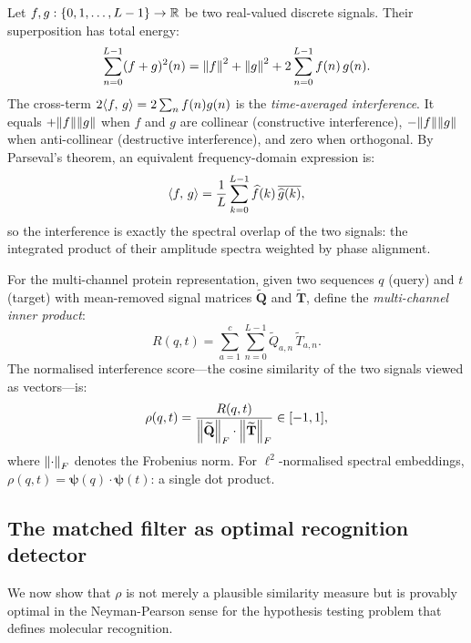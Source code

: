 Let $f, g: \{0,1,\ldots,L-1\} \to \mathbb{R}$ be two real-valued discrete signals.
Their superposition has total energy:
\begin{equation}
  \sum_{n=0}^{L-1}(f+g)^2(n)
  = \norm{f}^2 + \norm{g}^2
    + 2\sum_{n=0}^{L-1} f(n)\,g(n).
  \label{im:eq:superposition}
\end{equation}
The cross-term $2\langle f,\, g \rangle = 2\sum_n f(n)g(n)$ is the
\emph{time-averaged interference}. It equals $+\norm{f}\norm{g}$ when $f$
and $g$ are collinear (constructive interference),
$-\norm{f}\norm{g}$ when anti-collinear (destructive interference),
and zero when orthogonal. By Parseval's theorem, an equivalent frequency-domain
expression is:
\begin{equation}
  \langle f,\, g \rangle
  = \frac{1}{L}\sum_{k=0}^{L-1}\widehat{f}(k)\,\overline{\widehat{g}(k)},
  \label{im:eq:parseval_innerprod}
\end{equation}
so the interference is exactly the spectral overlap of the two signals: the
integrated product of their amplitude spectra weighted by phase alignment.

For the multi-channel protein representation, given two sequences $q$ (query)
and $t$ (target) with mean-removed signal matrices $\widetilde{\mathbf{Q}}$
and $\widetilde{\mathbf{T}}$, define the \emph{multi-channel inner product}:
\begin{equation}
  R(q,t) = \sum_{a=1}^{c} \sum_{n=0}^{L-1}
    \widetilde{Q}_{a,n}\,\widetilde{T}_{a,n}.
  \label{im:eq:multichannel_ip}
\end{equation}
The normalised interference score---the cosine similarity of the two signals
viewed as vectors---is:
\begin{equation}
  \rho(q,t)
  = \frac{R(q,t)}
         {\norm{\widetilde{\mathbf{Q}}}_F \cdot \norm{\widetilde{\mathbf{T}}}_F}
  \in [-1,1],
  \label{im:eq:rho}
\end{equation}
where $\norm{\cdot}_F$ denotes the Frobenius norm. For $\ell^2$-normalised
spectral embeddings, $\rho(q,t) = \bm{\psi}(q)\cdot\bm{\psi}(t)$: a single
dot product.

\subsection{The matched filter as optimal recognition detector}
\label{im:sec:matched_filter}

We now show that $\rho$ is not merely a plausible similarity measure but is
provably optimal in the Neyman-Pearson sense for the hypothesis testing
problem that defines molecular recognition.

